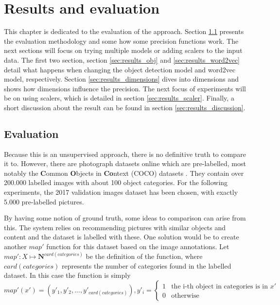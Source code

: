 \chapter{Results and evaluation}
\label{chap:results}

This chapter is dedicated to the evaluation of the approach. Section \ref{sec:results_eval} presents the evaluation methodology and some how some precision functions work. The next sections will focus on trying multiple models or adding scalers to the input data. The first two section, section \ref{sec:results_obj} and \ref{sec:results_word2vec} detail what happens when changing the object detection model and word2vec model, respectively. Section \ref{sec:results_dimensions} dives into dimensions and shows how dimensions influence the precision. The next focus of experiments will be on using scalers, which is detailed in section \ref{sec:results_scaler}. Finally, a short discussion about the result can be found in section \ref{sec:results_discussion}.

\section{Evaluation}
\label{sec:results_eval}

Because this is an unsupervised approach, there is no definitive truth to compare it to. However, there are photograph datasets online which are pre-labelled, most notably the \textbf{C}ommon \textbf{O}bjects in \textbf{Co}ntext (COCO) datasets \cite{coco}. They contain over 200.000 labelled images with about 100 object categories. For the following experiments, the 2017 validation images dataset has been chosen, with exactly 5.000 pre-labelled pictures.

By having some notion of ground truth, some ideas to comparison can arise from this. The system relies on recommending pictures with similar objects and content and the dataset is labelled with these. One solution would be to create another $map'$ function for this dataset based on the image annotations. Let $map' : X \mapsto \mathbf{N}^{card(categories)} $ be the definition of the function, where $card(categories)$ represents the number of categories found in the labelled dataset. In this case the function is simply 
$$ map'(x') = (y'_1, y'_2, ..., y'_{card(categories)}), y'_i = 
	\begin{cases}
		1 & \textrm{the i-th object in categories is in } x' \\
		0 & \textrm{otherwise}
	\end{cases}
$$

